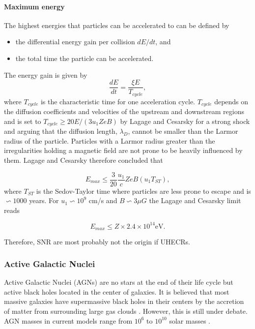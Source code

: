 \paragraph{Maximum energy}
\label{para:maxenergy}
The highest energies that particles can be accelerated to can be defined by

\vspace{2mm}
\begin{itemize}
\item the differential energy gain per collision $dE/dt$, and
\item the total time the particle can be accelerated.
\end{itemize}
\vspace{2mm}
\noindent The energy gain is given by
\begin{equation}
\frac{dE}{dt} = \frac{\xi E}{T_{cycle}},
\end{equation}
where $T_{cycle}$ is the characteristic time for one acceleration cycle. $T_{cycle}$ depends on the diffusion coefficients and velocities of the upstream and downstream regions and is set to $T_{cycle} \geq 20 E/(3 u_1 Z e B)$ by Lagage and Cesarsky \cite{Lagage:1983zz} for a strong shock and arguing that the diffusion length, $\lambda_D$, cannot be smaller than the Larmor radius of the particle. Particles with a Larmor radius greater than the irregularities holding a magnetic field are not prone to be heavily influenced by them. Lagage and Cesarsky therefore concluded that

\begin{equation}
E_{max} \leq \frac{3}{20} \frac{u_1}{c} Z e B (u_1 T_{ST}),
\end{equation}
where $T_{ST}$ is the Sedov-Taylor time where particles are less prone to escape and is $\backsim 1000$ years. For $u_1 \backsim 10^9$ cm/s \cite{stanev2010high}  and $B \backsim 3\mu G$ the Lagage and Cesarsky limit reads

\begin{equation}
E_{max} \leq Z \times 2.4 \times 10^{14} \textrm{eV}.
\end{equation}

\noindent Therefore, SNR are most probably not the origin if UHECRs.

\subsubsection{Active Galactic Nuclei}
\label{subsubsec:agn}
Active Galactic Nuclei (AGNs) are no stars at the end of their life cycle but active black holes located in the center of galaxies. It is believed that most massive galaxies have supermassive black holes in their centers by the accretion of matter from surrounding large gas clouds \cite{Urry:1995mg,Antonucci:1993sg}. However, this is still under debate. AGN masses in current models range from $10^6$ to $10^{10}$ solar masses \cite{Kazanas:2012sk}.

